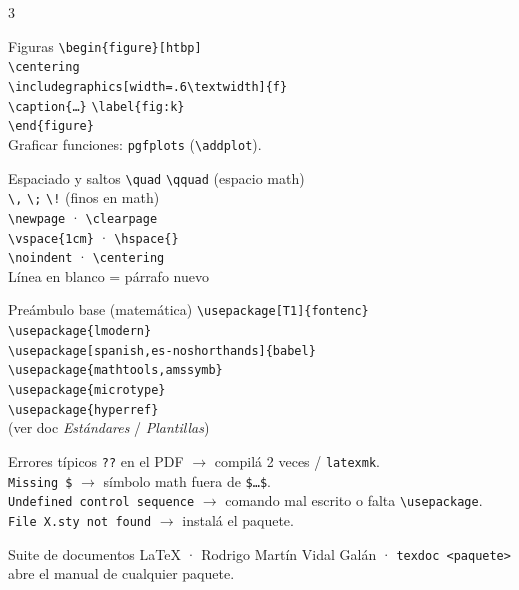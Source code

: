\documentclass[9pt,a4paper,landscape]{extarticle}
\newcommand{\K}[1]{\texttt{\textbackslash #1}}
\begin{document}
\begin{multicols}{3}
\begin{blk}{Figuras}
\texttt{\textbackslash begin\{figure\}[htbp]}\\
\hspace*{0.5em}\K{centering}\\
\hspace*{0.5em}\K{includegraphics[width=.6\textbackslash textwidth]\{f\}}\\
\hspace*{0.5em}\K{caption\{\dots\}} \K{label\{fig:k\}}\\
\texttt{\textbackslash end\{figure\}}\\[2pt]
{\footnotesize Graficar funciones: \texttt{pgfplots} (\K{addplot}).}
\end{blk}

\begin{blk}{Espaciado y saltos}
\K{quad} \K{qquad} (espacio math)\\
\K{,} \K{;} \K{!} (finos en math)\\
\K{newpage} · \K{clearpage}\\
\K{vspace\{1cm\}} · \K{hspace\{\}}\\
\K{noindent} · \K{centering}\\
{\footnotesize Línea en blanco = párrafo nuevo}
\end{blk}

\begin{blk}{Preámbulo base (matemática)}
\K{usepackage[T1]\{fontenc\}}\\
\K{usepackage\{lmodern\}}\\
\K{usepackage[spanish,es-noshorthands]\{babel\}}\\
\K{usepackage\{mathtools,amssymb\}}\\
\K{usepackage\{microtype\}}\\
\K{usepackage\{hyperref\}}\\
{\footnotesize (ver doc \emph{Estándares} / \emph{Plantillas})}
\end{blk}

\begin{blk}{Errores típicos}
{\footnotesize
\texttt{??} en el PDF $\to$ compilá 2 veces / \texttt{latexmk}.\\[2pt]
\texttt{Missing \$} $\to$ símbolo math fuera de \texttt{\$\dots\$}.\\[2pt]
\texttt{Undefined control sequence} $\to$ comando mal escrito o falta \K{usepackage}.\\[2pt]
\texttt{File X.sty not found} $\to$ instalá el paquete.}
\end{blk}

\end{multicols}

\vfill
\begin{center}\footnotesize
Suite de documentos \LaTeX{} · Rodrigo Martín Vidal Galán ·
\texttt{texdoc <paquete>} abre el manual de cualquier paquete.
\end{center}
\end{document}
